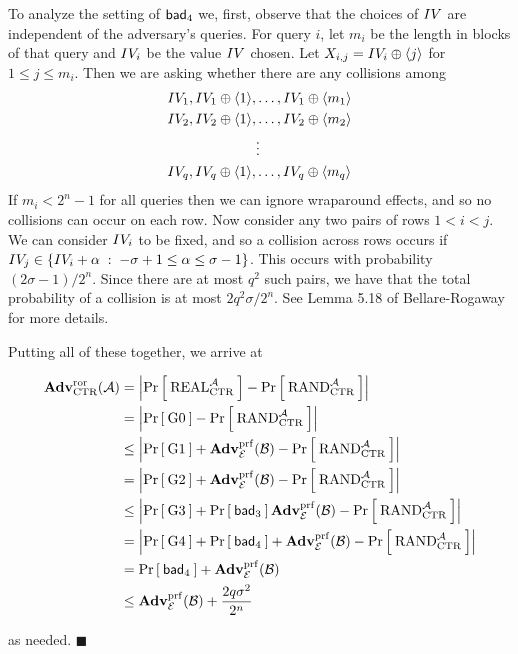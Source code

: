 To analyze the setting of $\mathsf{bad}_4$ we, first, observe that the choices of $IV$
are independent of the adversary's queries. For query $i$, let $m_i$ be the
length in blocks of that query and $IV_i$ be the value $IV$ chosen.
Let $X_{i,j} = IV_i \oplus \langle j\rangle$ for $1 \le j \le m_i$. Then we are
asking whether there are any collisions among 
\begin{align*}
    &\IV_1 , \IV_1 \oplus \langle 1\rangle, \ldots , \IV_1 \oplus \langle m_1\rangle \\
    &\IV_2 , \IV_2 \oplus \langle 1\rangle, \ldots , \IV_2 \oplus \langle m_2\rangle \\
    &\phantom{\IV_2 , \IV_2 \oplus \langle 1\rangle, } \vdots\\
    &\IV_q , \IV_q \oplus \langle 1\rangle, \ldots , \IV_q \oplus \langle m_q\rangle \\
\end{align*}
If $m_i < 2^n-1$ for all queries then we can ignore wraparound effects, and so
no collisions can occur on each row. Now consider any two pairs of rows $1 < i
< j$. We can consider $IV_i$ to be fixed, and so a collision across rows
occurs if $IV_j \in \{IV_i + \alpha \;:\; -\sigma +1 \le \alpha \le
\sigma-1\}$. This occurs with probability $(2\sigma-1) / 2^n$. Since there are
at most $q^2$ such pairs, we have that the total probability of a collision is
at most $2q^2\sigma / 2^n$. See Lemma 5.18 of Bellare-Rogaway for more details.

Putting all of these together, we arrive at

\begin{align*}
  \mathbf{Adv}^{\mathrm{ror}}_{\textnormal{CTR}}({\mathcal A}) 
    &= \left| \Pr\left[\: \textnormal{REAL}_{\textnormal{CTR}}^{\mathcal A} \:\right] - \Pr\left[\: \textnormal{RAND}_{\textnormal{CTR}}^{\mathcal A} \:\right]\right|\\
    &= \left| \Pr\left[\: {{\textnormal G}}0 \:\right] - \Pr\left[\: \textnormal{RAND}_{\textnormal{CTR}}^{\mathcal A} \:\right]\right|\\
    &\le \left| \Pr\left[\: {{\textnormal G}}1 \:\right] + \mathbf{Adv}^{\mathrm{prf}}_{{\cal E}}({\mathcal B}) - \Pr\left[\: \textnormal{RAND}_{\textnormal{CTR}}^{\mathcal A} \:\right]\right|\\
    &= \left| \Pr\left[\: {{\textnormal G}}2 \:\right] + \mathbf{Adv}^{\mathrm{prf}}_{{\cal E}}({\mathcal B}) - \Pr\left[\: \textnormal{RAND}_{\textnormal{CTR}}^{\mathcal A} \:\right]\right|\\
    &\le \left| \Pr\left[\: {{\textnormal G}}3 \:\right] + \Pr\left[\: \mathsf{bad}_3 \:\right] \mathbf{Adv}^{\mathrm{prf}}_{{\cal E}}({\mathcal B}) - \Pr\left[\: \textnormal{RAND}_{\textnormal{CTR}}^{\mathcal A} \:\right]\right|\\
    &= \left| \Pr\left[\: {{\textnormal G}}4 \:\right] + \Pr\left[\: \mathsf{bad}_4 \:\right] + \mathbf{Adv}^{\mathrm{prf}}_{{\cal E}}({\mathcal B}) - \Pr\left[\: \textnormal{RAND}_{\textnormal{CTR}}^{\mathcal A} \:\right]\right|\\
    &= \Pr\left[\: \mathsf{bad}_4 \:\right] + \mathbf{Adv}^{\mathrm{prf}}_{{\cal E}}({\mathcal B})\\
    &\le \mathbf{Adv}^{\mathrm{prf}}_{{\cal E}}({\mathcal B}) + \frac{2q\sigma^2}{2^n}
\end{align*}

as needed. $\blacksquare$



